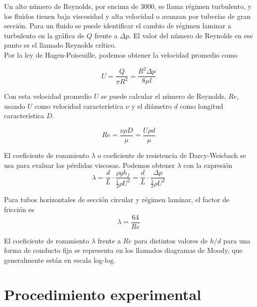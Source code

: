 \documentclass[a4paper,12pt,spanish]{article}
\begin{document}
	Un alto número de Reynolds, por encima de 3000, se llama régimen turbulento, y los fluidos tienen baja viscosidad y alta velocidad o avanzan por tuberías de gran sección. Para un fluido se puede identificar el cambio de régimen laminar a turbulento en la gráfica de $Q$ frente a $\mathit{\Delta}p$. El valor del número de Reynolds en ese punto es el llamado Reynolds crítico.\\
	
	
	Por la ley de Hagen-Poiseuille, podemos obtener la velocidad promedio como
	
	\[U = \frac{Q}{\pi R^2} = \frac{R^2 \mathit{\Delta} p}{8\mu l}\]
	
	Con esta velocidad promedio $U$ se puede calcular el número de Reynolds, $Re$, usando $U$ como velocidad característica $\nu$ y el diámetro $d$ como longitud característica $D$.
	
	\[Re = \frac{\nu \rho D}{\mu}= \frac{U \rho d}{\mu}\] 
	
	\vspace{\baselineskip}
	
	El coeficiente de rozamiento $\lambda$ o coeficiente de resistencia de Darcy-Weisbach se usa para evaluar las pérdidas viscosas. Podemos obtener $\lambda$ con la expresión
	\[\lambda = \frac{d}{L} \cdot \frac{\rho g h_f}{\frac{1}{2} \rho U^2} = \frac{d}{L} \cdot \frac{\mathit{\Delta}p}{\frac{1}{2} \rho U^2}\]
	
	Para tubos horizontales de sección circular y régimen laminar, el factor de fricción es 
	\[\lambda = \frac{64}{Re}\]
	
	El coeficiente de rozamiento $\lambda$ frente a $Re$ para distintos valores de $h/d$ para una forma de conducto fija se representa en los llamados diagramas de Moody, que generalmente están en escala log-log.
	
	
	
	\section{Procedimiento experimental}
	
\end{document}
